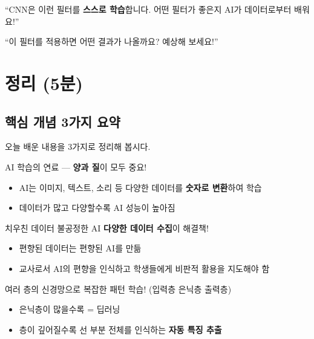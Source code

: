 \documentclass[11pt,a4paper]{article}
\begin{document}
\begin{keybox}
``CNN은 이런 필터를 \textbf{스스로 학습}합니다. 어떤 필터가 좋은지 AI가 데이터로부터 배워요!''
\end{keybox}

\begin{scriptbox}
``이 필터를 적용하면 어떤 결과가 나올까요? 예상해 보세요!''
\end{scriptbox}

\newpage

\section{ 정리 (5분)}

\subsection{핵심 개념 3가지 요약}

오늘 배운 내용을 3가지로 정리해 봅시다.

\begin{summarybox}
AI 학습의 연료 --- \textbf{양과 질}이 모두 중요!

\begin{itemize}[nosep]
    \item AI는 이미지, 텍스트, 소리 등 다양한 데이터를 \textbf{숫자로 변환}하여 학습
    \item 데이터가 많고 다양할수록 AI 성능이 높아짐
\end{itemize}
\end{summarybox}

\begin{summarybox}
치우친 데이터 \textrightarrow{} 불공정한 AI \textrightarrow{} \textbf{다양한 데이터 수집}이 해결책!

\begin{itemize}[nosep]
    \item 편향된 데이터는 편향된 AI를 만듦
    \item 교사로서 AI의 편향을 인식하고 학생들에게 비판적 활용을 지도해야 함
\end{itemize}
\end{summarybox}

\begin{summarybox}
여러 층의 신경망으로 복잡한 패턴 학습! (입력층 \textrightarrow{} 은닉층 \textrightarrow{} 출력층)

\begin{itemize}[nosep]
    \item 은닉층이 많을수록 = 딥러닝
    \item 층이 깊어질수록 선 \textrightarrow{} 부분 \textrightarrow{} 전체를 인식하는 \textbf{자동 특징 추출}
\end{itemize}
\end{summarybox}
\end{document}
